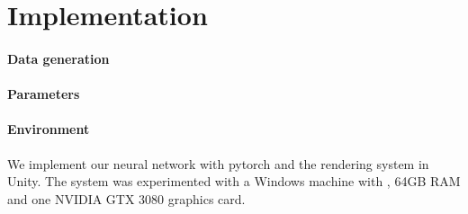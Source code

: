 \section{Implementation}
\paragraph{Data generation}

\paragraph{Parameters}

\paragraph{Environment}
We implement our neural network with pytorch and the rendering system in Unity.
The system was experimented with a Windows machine with , 64GB RAM and one NVIDIA GTX 3080 graphics card.